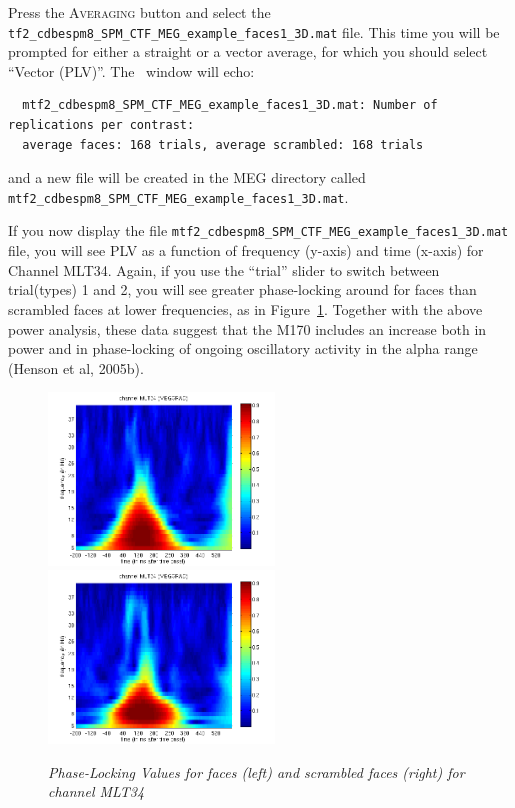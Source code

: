 Press the \textsc{Averaging} button and select the \texttt{tf2\_\-cdbespm8\_\-SPM\_\-CTF\_\-MEG\_\-example\_\-faces1\_\-3D.mat} file. This time you will be prompted for either a straight or a vector average, for which you should select ``Vector (PLV)''. The \matlab\ window will echo:

\begin{verbatim}
  mtf2_cdbespm8_SPM_CTF_MEG_example_faces1_3D.mat: Number of replications per contrast:
  average faces: 168 trials, average scrambled: 168 trials
\end{verbatim}

and a new file will be created in the MEG directory called \texttt{mtf2\_\-cdbespm8\_\-SPM\_\-CTF\_\-MEG\_\-example\_\-faces1\_\-3D.mat}.

If you now display the file \texttt{mtf2\_\-cdbespm8\_\-SPM\_\-CTF\_\-MEG\_\-example\_\-faces1\_\-3D.mat} file, you will see PLV as a function of frequency (y-axis) and time (x-axis) for Channel MLT34. Again, if you use the ``trial'' slider to switch between trial(types) 1 and 2, you will see greater phase-locking around for faces than scrambled faces at lower frequencies, as in Figure~\ref{multimodal:fig:14}. Together with the above power analysis, these data suggest that the M170 includes an increase both in power and in phase-locking of ongoing oscillatory activity in the alpha range (Henson et al, 2005b).

\begin{figure}
\begin{center}
\includegraphics[width=60mm]{multimodal/figures/meg_plv_faces}
\includegraphics[width=60mm]{multimodal/figures/meg_plv_scrambled}
\caption{\em Phase-Locking Values for faces (left) and scrambled faces (right) for channel MLT34 \label{multimodal:fig:14}}
\end{center}
\end{figure}

